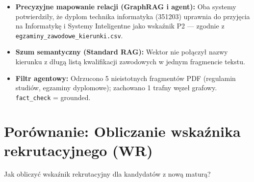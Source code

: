 \begin{tcolorbox}[colback=green!5!white,colframe=green!50!black,title=Wnioski i obserwacje]
    \begin{itemize}
        \item \textbf{Precyzyjne mapowanie relacji (GraphRAG i agent):} Oba systemy potwierdziły, że dyplom technika informatyka (351203) uprawnia do przyjęcia na Informatykę i Systemy Inteligentne jako wskaźnik P2 --- zgodnie z \texttt{egzaminy\_zawodowe\_kierunki.csv}.
        \item \textbf{Szum semantyczny (Standard RAG):} Wektor nie połączył nazwy kierunku z długą listą kwalifikacji zawodowych w jednym fragmencie tekstu.
        \item \textbf{Filtr agentowy:} Odrzucono 5 nieistotnych fragmentów PDF (regulamin studiów, egzaminy dyplomowe); zachowano 1 trafny węzeł grafowy. \texttt{fact\_check} = grounded.
    \end{itemize}
\end{tcolorbox}
\vspace{1em}

\newpage
\section*{Porównanie: Obliczanie wskaźnika rekrutacyjnego (WR)}

\begin{tcolorbox}[colback=blue!5!white,colframe=blue!75!black,title=Pytanie użytkownika]
    Jak obliczyć wskaźnik rekrutacyjny dla kandydatów z nową maturą?
\end{tcolorbox}

